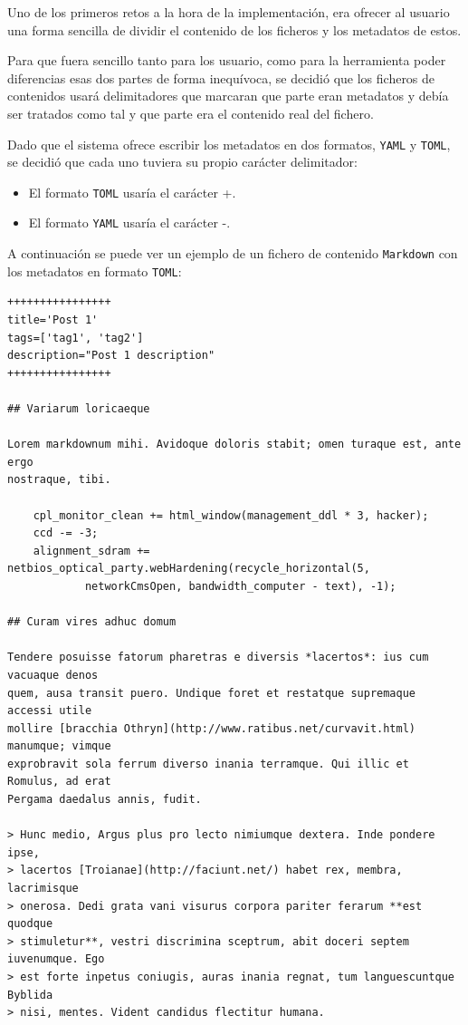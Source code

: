 Uno de los primeros retos a la hora de la implementación, era ofrecer al usuario una forma sencilla de dividir
el contenido de los ficheros y los metadatos de estos.

Para que fuera sencillo tanto para los usuario, como para la herramienta poder diferencias esas dos partes
de forma inequívoca, se decidió que los ficheros de contenidos usará delimitadores que marcaran que
parte eran metadatos y debía ser tratados como tal y que parte era el contenido real del fichero.

Dado que el sistema ofrece escribir los metadatos en dos formatos, \texttt{YAML} y \texttt{TOML}, se decidió que cada
uno tuviera su propio carácter delimitador:

\begin{itemize}
    \item El formato \texttt{TOML} usaría el carácter +.
    \item El formato \texttt{YAML} usaría el carácter -.
\end{itemize}

A continuación se puede ver un ejemplo de un fichero de contenido \texttt{Markdown} con los metadatos en formato
\texttt{TOML}:

\begin{verbatim}
++++++++++++++++
title='Post 1'
tags=['tag1', 'tag2']
description="Post 1 description"
++++++++++++++++

## Variarum loricaeque

Lorem markdownum mihi. Avidoque doloris stabit; omen turaque est, ante ergo
nostraque, tibi.

    cpl_monitor_clean += html_window(management_ddl * 3, hacker);
    ccd -= -3;
    alignment_sdram += netbios_optical_party.webHardening(recycle_horizontal(5,
            networkCmsOpen, bandwidth_computer - text), -1);

## Curam vires adhuc domum

Tendere posuisse fatorum pharetras e diversis *lacertos*: ius cum vacuaque denos
quem, ausa transit puero. Undique foret et restatque supremaque accessi utile
mollire [bracchia Othryn](http://www.ratibus.net/curvavit.html) manumque; vimque
exprobravit sola ferrum diverso inania terramque. Qui illic et Romulus, ad erat
Pergama daedalus annis, fudit.

> Hunc medio, Argus plus pro lecto nimiumque dextera. Inde pondere ipse,
> lacertos [Troianae](http://faciunt.net/) habet rex, membra, lacrimisque
> onerosa. Dedi grata vani visurus corpora pariter ferarum **est quodque
> stimuletur**, vestri discrimina sceptrum, abit doceri septem iuvenumque. Ego
> est forte inpetus coniugis, auras inania regnat, tum languescuntque Byblida
> nisi, mentes. Vident candidus flectitur humana.
\end{verbatim}

